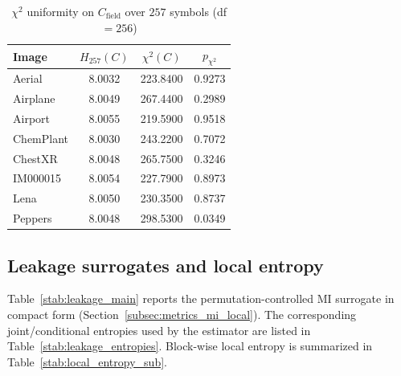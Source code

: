 \begin{table}[ht!]
\centering
\caption{$\chi^2$ uniformity on $C_{\mathrm{field}}$ over $257$ symbols (df$=256$)}
\label{stab:chi2_uniformity_pf257}
{\scriptsize
\begin{tabular*}{\columnwidth}{@{\extracolsep{\fill}}l
    S[table-format=1.4]
    S[table-format=3.4]
    S[table-format=1.4] @{}}
\hline
\textbf{Image} &
 &
 &
 \\
\hline
Aerial     & 8.0032 & 223.8400 & 0.9273 \\
Airplane   & 8.0049 & 267.4400 & 0.2989 \\
Airport    & 8.0055 & 219.5900 & 0.9518 \\
ChemPlant  & 8.0030 & 243.2200 & 0.7072 \\
ChestXR    & 8.0048 & 265.7500 & 0.3246 \\
IM000015   & 8.0054 & 227.7900 & 0.8973 \\
Lena       & 8.0050 & 230.3500 & 0.8737 \\
Peppers    & 8.0048 & 298.5300 & 0.0349 \\
\hline
\end{tabular*}
}
\end{table}


\subsection{Leakage surrogates and local entropy}
\label{subsec:leakage_app}

Table~\ref{stab:leakage_main} reports the permutation-controlled MI surrogate in compact form
(Section~\ref{subsec:metrics_mi_local}). The corresponding joint/conditional entropies used by the estimator
are listed in Table~\ref{stab:leakage_entropies}. Block-wise local entropy is summarized in
Table~\ref{stab:local_entropy_sub}.

